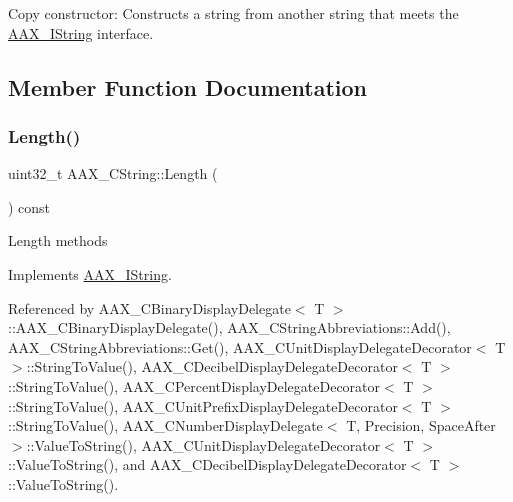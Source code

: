 Copy constructor\+: Constructs a string from another string that meets the \mbox{\hyperlink{a01873}{A\+A\+X\+\_\+\+I\+String}} interface. 

\subsection{Member Function Documentation}
\mbox{\label{a01573_a34ccfa250b53a721417f32d4a74bfed6}} 
\subsubsection{\texorpdfstring{Length()}{Length()}}
{\footnotesize\ttfamily uint32\+\_\+t A\+A\+X\+\_\+\+C\+String\+::\+Length (\begin{DoxyParamCaption}{ }\end{DoxyParamCaption}) const\hspace{0.3cm}{\ttfamily [virtual]}}

Length methods 

Implements \mbox{\hyperlink{a01873_a4d4440bf68aa5ae4bf3dc6639cbf95c9}{A\+A\+X\+\_\+\+I\+String}}.



Referenced by A\+A\+X\+\_\+\+C\+Binary\+Display\+Delegate$<$ T $>$\+::\+A\+A\+X\+\_\+\+C\+Binary\+Display\+Delegate(), A\+A\+X\+\_\+\+C\+String\+Abbreviations\+::\+Add(), A\+A\+X\+\_\+\+C\+String\+Abbreviations\+::\+Get(), A\+A\+X\+\_\+\+C\+Unit\+Display\+Delegate\+Decorator$<$ T $>$\+::\+String\+To\+Value(), A\+A\+X\+\_\+\+C\+Decibel\+Display\+Delegate\+Decorator$<$ T $>$\+::\+String\+To\+Value(), A\+A\+X\+\_\+\+C\+Percent\+Display\+Delegate\+Decorator$<$ T $>$\+::\+String\+To\+Value(), A\+A\+X\+\_\+\+C\+Unit\+Prefix\+Display\+Delegate\+Decorator$<$ T $>$\+::\+String\+To\+Value(), A\+A\+X\+\_\+\+C\+Number\+Display\+Delegate$<$ T, Precision, Space\+After $>$\+::\+Value\+To\+String(), A\+A\+X\+\_\+\+C\+Unit\+Display\+Delegate\+Decorator$<$ T $>$\+::\+Value\+To\+String(), and A\+A\+X\+\_\+\+C\+Decibel\+Display\+Delegate\+Decorator$<$ T $>$\+::\+Value\+To\+String().

